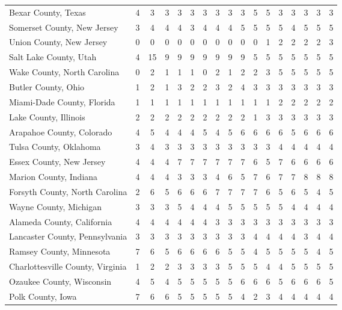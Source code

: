 \begin{landscape}
\begin{longtable}{lcccccccccccccccc}
	Bexar County, Texas & 4 & 3 & 3 & 3 & 3 & 3 & 3 & 3 & 3 & 5 & 5 & 3 & 3 & 3 & 3 & 3 \\
	Somerset County, New Jersey & 3 & 4 & 4 & 4 & 3 & 4 & 4 & 4 & 5 & 5 & 5 & 5 & 4 & 5 & 5 & 5 \\
	Union County, New Jersey & 0 & 0 & 0 & 0 & 0 & 0 & 0 & 0 & 0 & 0 & 1 & 2 & 2 & 2 & 2 & 3 \\
	Salt Lake County, Utah & 4 & 15 & 9 & 9 & 9 & 9 & 9 & 9 & 9 & 5 & 5 & 5 & 5 & 5 & 5 & 5 \\
	Wake County, North Carolina & 0 & 2 & 1 & 1 & 1 & 0 & 2 & 1 & 2 & 2 & 3 & 5 & 5 & 5 & 5 & 5 \\
	Butler County, Ohio & 1 & 2 & 1 & 3 & 2 & 2 & 3 & 2 & 4 & 3 & 3 & 3 & 3 & 3 & 3 & 3 \\
	Miami-Dade County, Florida & 1 & 1 & 1 & 1 & 1 & 1 & 1 & 1 & 1 & 1 & 1 & 2 & 2 & 2 & 2 & 2 \\
	Lake County, Illinois & 2 & 2 & 2 & 2 & 2 & 2 & 2 & 2 & 2 & 1 & 3 & 3 & 3 & 3 & 3 & 3 \\
	Arapahoe County, Colorado & 4 & 5 & 4 & 4 & 4 & 5 & 4 & 5 & 6 & 6 & 6 & 6 & 5 & 6 & 6 & 6 \\
	Tulsa County, Oklahoma & 3 & 4 & 3 & 3 & 3 & 3 & 3 & 3 & 3 & 3 & 3 & 4 & 4 & 4 & 4 & 4 \\
	Essex County, New Jersey & 4 & 4 & 4 & 7 & 7 & 7 & 7 & 7 & 7 & 6 & 5 & 7 & 6 & 6 & 6 & 6 \\
	Marion County, Indiana & 4 & 4 & 4 & 3 & 3 & 3 & 4 & 6 & 5 & 7 & 6 & 7 & 7 & 8 & 8 & 8 \\
	Forsyth County, North Carolina & 2 & 6 & 5 & 6 & 6 & 6 & 7 & 7 & 7 & 7 & 6 & 5 & 6 & 5 & 4 & 5 \\
	Wayne County, Michigan & 3 & 3 & 3 & 5 & 4 & 4 & 4 & 5 & 5 & 5 & 5 & 5 & 4 & 4 & 4 & 4 \\
	Alameda County, California & 4 & 4 & 4 & 4 & 4 & 4 & 3 & 3 & 3 & 3 & 3 & 3 & 3 & 3 & 3 & 3 \\
	Lancaster County, Pennsylvania & 3 & 3 & 3 & 3 & 3 & 3 & 3 & 3 & 3 & 4 & 4 & 4 & 4 & 3 & 4 & 4 \\
	Ramsey County, Minnesota & 7 & 6 & 5 & 6 & 6 & 6 & 6 & 5 & 5 & 4 & 5 & 5 & 5 & 5 & 4 & 5 \\
	Charlottesville County, Virginia & 1 & 2 & 2 & 3 & 3 & 3 & 3 & 5 & 5 & 5 & 4 & 4 & 5 & 5 & 5 & 5 \\
	Ozaukee County, Wisconsin & 4 & 5 & 4 & 5 & 5 & 5 & 5 & 5 & 6 & 6 & 6 & 5 & 6 & 6 & 6 & 5 \\
	Polk County, Iowa & 7 & 6 & 6 & 5 & 5 & 5 & 5 & 5 & 4 & 2 & 3 & 4 & 4 & 4 & 4 & 4 \\

\end{longtable}
\end{landscape}
